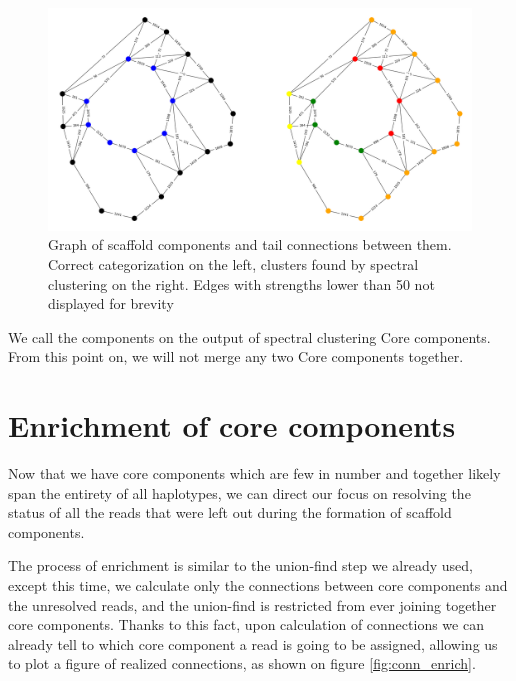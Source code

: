 \begin{figure}
\includegraphics[width=450bp]{figures/spectral2.png}
\caption{Graph of scaffold components and tail connections between them. Correct categorization on the left, clusters found by spectral clustering on the right. Edges with strengths lower than 50 not displayed for brevity}
\label{fig:tails}
\end{figure}

We call the components on the output of spectral clustering Core components. From this point on, we will not merge any two Core components together.

\section{Enrichment of core components}

Now that we have core components which are few in number and together likely span the entirety of all haplotypes, we can direct our focus on resolving the status of all the reads that were left out during the formation of scaffold components. 

The process of enrichment is similar to the union-find step we already used, except this time, we calculate only the connections between core components and the unresolved reads, and the union-find is restricted from ever joining together core components. Thanks to this fact, upon calculation of connections we can already tell to which core component a read is going to be assigned, allowing us to plot a figure of realized connections, as shown on figure \ref{fig:conn_enrich}.

